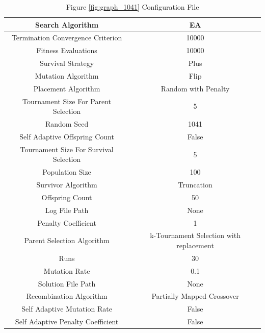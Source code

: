 \documentclass{standalone}
\begin{document}
\clearpage
\begin{table}[!htb]
	\centering
	\caption{Figure \ref{fig:graph_1041} Configuration File}
	\label{tab:graph_1041}
	\begin{tabular}{| c | c |}
		\hline
		Search Algorithm		& EA		 \\
		\hline
		Termination Convergence Criterion		& 10000		 \\
		\hline
		Fitness Evaluations		& 10000		 \\
		\hline
		Survival Strategy		& Plus		 \\
		\hline
		Mutation Algorithm		& Flip		 \\
		\hline
		Placement Algorithm		& Random with Penalty		 \\
		\hline
		Tournament Size For Parent Selection		& 5		 \\
		\hline
		Random Seed		& 1041		 \\
		\hline
		Self Adaptive Offspring Count		& False		 \\
		\hline
		Tournament Size For Survival Selection		& 5		 \\
		\hline
		Population Size		& 100		 \\
		\hline
		Survivor Algorithm		& Truncation		 \\
		\hline
		Offspring Count		& 50		 \\
		\hline
		Log File Path		& None		 \\
		\hline
		Penalty Coefficient		& 1		 \\
		\hline
		Parent Selection Algorithm		& k-Tournament Selection with replacement		 \\
		\hline
		Runs		& 30		 \\
		\hline
		Mutation Rate		& 0.1		 \\
		\hline
		Solution File Path		& None		 \\
		\hline
		Recombination Algorithm		& Partially Mapped Crossover		 \\
		\hline
		Self Adaptive Mutation Rate		& False		 \\
		\hline
		Self Adaptive Penalty Coefficient		& False		 \\
		\hline
	\end{tabular}
\end{table}
\end{document}

